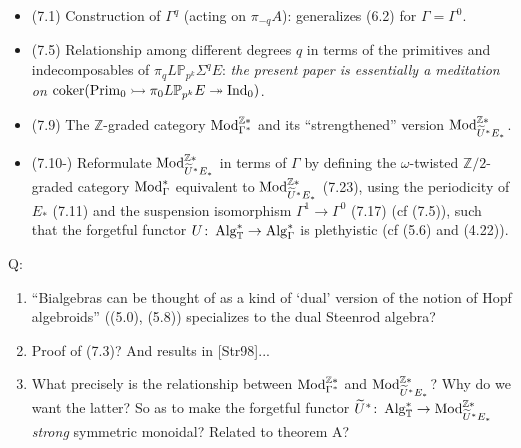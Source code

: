 \documentclass{rs}
\theoremstyle{definition}
\theoremstyle{remark}
\def\co{\colon\thinspace}
\newcommand{\mb}[1]{\mathbb{#1}}
\renewcommand{\=}{\approx}
\renewcommand{\-}{\sim}
\numberwithin{equation}{section}
\numberwithin{thm}{section}
\begin{document}
\begin{itemize}
 \item (7.1) Construction of $\Gamma^q$ (acting on $\pi_{-q} A$): generalizes (6.2) for $\Gamma = \Gamma^0$.

 \item (7.5) Relationship among different degrees $q$ in terms of the primitives and indecomposables of $\pi_q L {\mb P}_{p^k} \Sigma^q E$: 
 {\em the present paper is essentially a meditation on} ${\rm coker} ({\rm Prim}_0 \rightarrowtail \pi_0 L {\mb P}_{p^k} E \twoheadrightarrow {\rm Ind}_0)$.

 \item (7.9) The $\mb Z$-graded category ${\rm Mod}_{\Gamma^*}^{\mb Z *}$ and its ``strengthened'' version ${\rm Mod}_{\widetilde{U}^* E_*}^{\mb Z *}$.

 \item (7.10-) Reformulate ${\rm Mod}_{\widetilde{U}^* E_*}^{\mb Z *}$ in terms of $\Gamma$ by defining the $\omega$-twisted ${\mb Z}/2$-graded category 
 ${\rm Mod}_\Gamma^*$ equivalent to ${\rm Mod}_{\widetilde{U}^* E_*}^{\mb Z *}$ (7.23), 
 using the periodicity of $E_*$ (7.11) and the suspension isomorphism $\Gamma^1 \to \Gamma^0$ (7.17) (cf (7.5)), 
 such that the forgetful functor $U \co {\rm Alg}_{\mb T}^* \to {\rm Alg}_\Gamma^*$ is plethyistic (cf (5.6) and (4.22)).
\end{itemize}
Q:
\begin{enumerate}
 \item ``Bialgebras can be thought of as a kind of `dual' version of the notion of Hopf algebroids'' ((5.0), (5.8)) specializes to the dual Steenrod algebra?

 \item Proof of (7.3)? And results in [Str98]...

 \item What precisely is the relationship between ${\rm Mod}_{\Gamma^*}^{\mb Z *}$ and ${\rm Mod}_{\widetilde{U}^* E_*}^{\mb Z *}$? 
 Why do we want the latter? So as to make the forgetful functor $\widetilde{U}^* \co {\rm Alg}_{\mb T}^* \to {\rm Mod}_{\widetilde{U}^* E_*}^{\mb Z *}$ 
 {\em strong} symmetric monoidal? Related to theorem A?
\end{enumerate}
\end{document}
